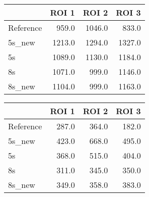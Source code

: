 \begin{tabular}{lrrr}
\toprule
{} &   ROI 1 &   ROI 2 &   ROI 3 \\
\midrule
Reference &   959.0 &  1046.0 &   833.0 \\
5s\_new    &  1213.0 &  1294.0 &  1327.0 \\
5s        &  1089.0 &  1130.0 &  1184.0 \\
8s        &  1071.0 &   999.0 &  1146.0 \\
8s\_new    &  1104.0 &   999.0 &  1163.0 \\
\bottomrule
\end{tabular}
\begin{tabular}{lrrr}
\toprule
{} &  ROI 1 &  ROI 2 &  ROI 3 \\
\midrule
Reference &  287.0 &  364.0 &  182.0 \\
5s\_new    &  423.0 &  668.0 &  495.0 \\
5s        &  368.0 &  515.0 &  404.0 \\
8s        &  311.0 &  345.0 &  350.0 \\
8s\_new    &  349.0 &  358.0 &  383.0 \\
\bottomrule
\end{tabular}
